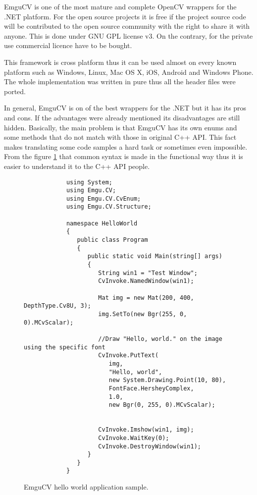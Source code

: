 \documentclass[../../../../main]{subfiles}
\begin{document}
\ac{EmguCV} is one of the most mature and complete \ac{OpenCV} wrappers for the .NET platform. For the open source projects it is free if the project source code will be contributed to the open source community with the right to share it with anyone. This is done under GNU GPL license v3. On the contrary, for the private use commercial licence have to be bought.

This framework is cross platform thus it can be used almost on every known platform such as Windows, Linux, Mac OS X, iOS, Android and Windows Phone. The whole implementation was written in pure {\Csharp} thus all the header files were ported.

In general, \ac{EmguCV} is on of the best wrappers for the .NET but it has its pros and cons. If the advantages were already mentioned its disadvantages are still hidden. Basically, the main problem is that \ac{EmguCV} has its own enums and some methods that do not match with those in original C++ \ac{API}. This fact makes translating some code samples a hard task or sometimes even impossible. From the figure \ref{emgucvhelloworld} that common syntax is made in the functional way thus it is easier to understand it to the C++ \ac{API} people.

\begin{figure} [!ht]
  \centering    
    \lstset{style=sharpc}
        \begin{lstlisting}
            using System;
            using Emgu.CV;
            using Emgu.CV.CvEnum;
            using Emgu.CV.Structure;
            
            namespace HelloWorld
            {
               public class Program
               {
                  public static void Main(string[] args)
                  {
                     String win1 = "Test Window";
                     CvInvoke.NamedWindow(win1);
            
                     Mat img = new Mat(200, 400, DepthType.Cv8U, 3); 
                     img.SetTo(new Bgr(255, 0, 0).MCvScalar);
            
                     //Draw "Hello, world." on the image using the specific font
                     CvInvoke.PutText(
                        img, 
                        "Hello, world", 
                        new System.Drawing.Point(10, 80), 
                        FontFace.HersheyComplex, 
                        1.0, 
                        new Bgr(0, 255, 0).MCvScalar);
                     
            
                     CvInvoke.Imshow(win1, img); 
                     CvInvoke.WaitKey(0); 
                     CvInvoke.DestroyWindow(win1);
                  }
               }
            }
        \end{lstlisting}
  \caption{EmguCV hello world application sample.}
  \label{emgucvhelloworld}
\end{figure}
\end{document}
